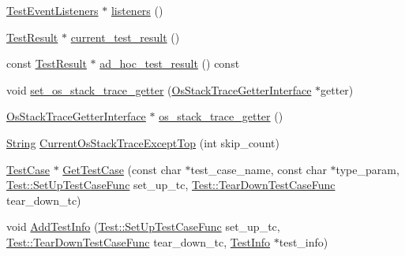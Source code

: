 \begin{DoxyCompactItemize}
\item 
\hyperlink{classtesting_1_1TestEventListeners}{\-Test\-Event\-Listeners} $\ast$ \hyperlink{classtesting_1_1internal_1_1UnitTestImpl_a371c481b63deeb0ecd47f42b4720480b}{listeners} ()
\item 
\hyperlink{classtesting_1_1TestResult}{\-Test\-Result} $\ast$ \hyperlink{classtesting_1_1internal_1_1UnitTestImpl_a847c541bb624cbb8ecc3ca24e755ac7c}{current\-\_\-test\-\_\-result} ()
\item 
const \hyperlink{classtesting_1_1TestResult}{\-Test\-Result} $\ast$ \hyperlink{classtesting_1_1internal_1_1UnitTestImpl_a0cc79239ea952483734abc4999de7d8a}{ad\-\_\-hoc\-\_\-test\-\_\-result} () const 
\item 
void \hyperlink{classtesting_1_1internal_1_1UnitTestImpl_a965c4bc292baeaefc41238f86f36f67c}{set\-\_\-os\-\_\-stack\-\_\-trace\-\_\-getter} (\hyperlink{classtesting_1_1internal_1_1OsStackTraceGetterInterface}{\-Os\-Stack\-Trace\-Getter\-Interface} $\ast$getter)
\item 
\hyperlink{classtesting_1_1internal_1_1OsStackTraceGetterInterface}{\-Os\-Stack\-Trace\-Getter\-Interface} $\ast$ \hyperlink{classtesting_1_1internal_1_1UnitTestImpl_aae448a88298f8b6c5ef2f80e53d138fc}{os\-\_\-stack\-\_\-trace\-\_\-getter} ()
\item 
\hyperlink{classtesting_1_1internal_1_1String}{\-String} \hyperlink{classtesting_1_1internal_1_1UnitTestImpl_a131dbc639dae87df46e7f92daad7c183}{\-Current\-Os\-Stack\-Trace\-Except\-Top} (int skip\-\_\-count)
\item 
\hyperlink{classtesting_1_1TestCase}{\-Test\-Case} $\ast$ \hyperlink{classtesting_1_1internal_1_1UnitTestImpl_aa19f802545df3b5cc294748b5aae3e46}{\-Get\-Test\-Case} (const char $\ast$test\-\_\-case\-\_\-name, const char $\ast$type\-\_\-param, \hyperlink{classtesting_1_1Test_a2df065892efeff7ca91bb2d2fbe00975}{\-Test\-::\-Set\-Up\-Test\-Case\-Func} set\-\_\-up\-\_\-tc, \hyperlink{classtesting_1_1Test_a4ae7a4e140c70dee5c9cb82e13ae570c}{\-Test\-::\-Tear\-Down\-Test\-Case\-Func} tear\-\_\-down\-\_\-tc)
\item 
void \hyperlink{classtesting_1_1internal_1_1UnitTestImpl_a0f73735489a968e6f6d57f791a246615}{\-Add\-Test\-Info} (\hyperlink{classtesting_1_1Test_a2df065892efeff7ca91bb2d2fbe00975}{\-Test\-::\-Set\-Up\-Test\-Case\-Func} set\-\_\-up\-\_\-tc, \hyperlink{classtesting_1_1Test_a4ae7a4e140c70dee5c9cb82e13ae570c}{\-Test\-::\-Tear\-Down\-Test\-Case\-Func} tear\-\_\-down\-\_\-tc, \hyperlink{classtesting_1_1TestInfo}{\-Test\-Info} $\ast$test\-\_\-info)
\item 

\end{DoxyCompactItemize}
